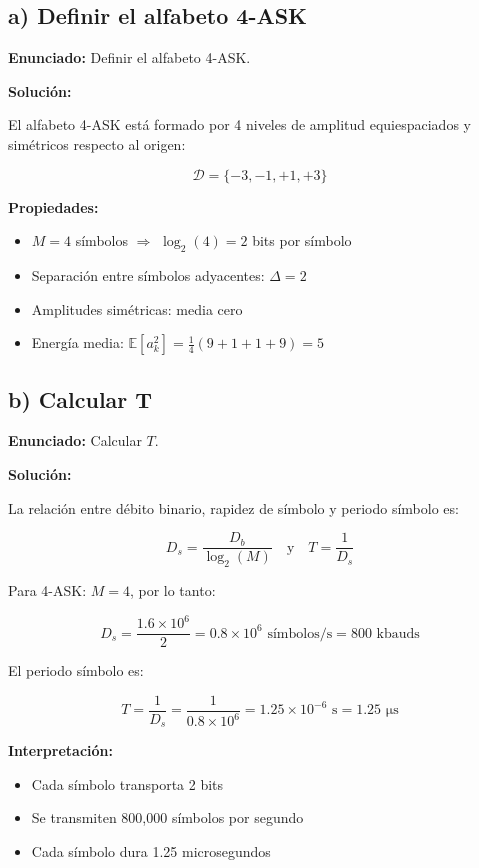 \documentclass[11pt,a4paper]{article}
\begin{document}
\subsection*{a) Definir el alfabeto 4-ASK}

\textbf{Enunciado:} Definir el alfabeto 4-ASK.

\vspace{0.3cm}
\textbf{Soluci\'on:}

El alfabeto 4-ASK est\'a formado por 4 niveles de amplitud equiespaciados y sim\'etricos respecto al origen:

\[
\boxed{\mathcal{D} = \{-3, -1, +1, +3\}}
\]

\textbf{Propiedades:}
\begin{itemize}
    \item $M = 4$ s\'imbolos $\Rightarrow$ $\log_2(4) = 2$ bits por s\'imbolo
    \item Separaci\'on entre s\'imbolos adyacentes: $\Delta = 2$
    \item Amplitudes sim\'etricas: media cero
    \item Energ\'ia media: $\mathbb{E}[a_k^2] = \frac{1}{4}(9 + 1 + 1 + 9) = 5$
\end{itemize}



\subsection*{b) Calcular T}

\textbf{Enunciado:} Calcular $T$.

\vspace{0.3cm}
\textbf{Soluci\'on:}

La relaci\'on entre d\'ebito binario, rapidez de s\'imbolo y periodo s\'imbolo es:

\[
D_s = \frac{D_b}{\log_2(M)} \quad \text{y} \quad T = \frac{1}{D_s}
\]

Para 4-ASK: $M = 4$, por lo tanto:

\[
D_s = \frac{1.6 \times 10^6}{2} = 0.8 \times 10^6 \text{ s\'imbolos/s} = 800 \text{ kbauds}
\]

El periodo s\'imbolo es:

\[
\boxed{T = \frac{1}{D_s} = \frac{1}{0.8 \times 10^6} = 1.25 \times 10^{-6} \text{ s} = 1.25 \text{ μs}}
\]

\textbf{Interpretaci\'on:}
\begin{itemize}
    \item Cada s\'imbolo transporta 2 bits
    \item Se transmiten 800,000 s\'imbolos por segundo
    \item Cada s\'imbolo dura 1.25 microsegundos
\end{itemize}
\end{document}
